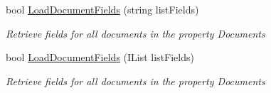 \begin{DoxyCompactItemize}
bool \hyperlink{class_database_object_a88ae0bcda671009e2742858ab945a18c}{Load\+Document\+Fields} (string list\+Fields)
\begin{DoxyCompactList}\small\item\em Retrieve fields for all documents in the property \textquotesingle{}Documents\textquotesingle{} \end{DoxyCompactList}\item 
bool \hyperlink{class_database_object_a8a64b91e2e4228b2fc552e51959987c4}{Load\+Document\+Fields} (I\+List list\+Fields)
\begin{DoxyCompactList}\small\item\em Retrieve fields for all documents in the property \textquotesingle{}Documents\textquotesingle{} \end{DoxyCompactList}\end{DoxyCompactItemize}
